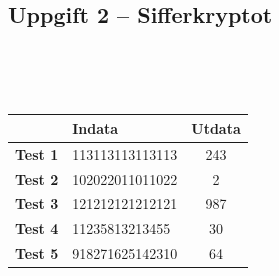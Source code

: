 \documentclass[a4paper,12pt,oneside]{amsbook}
\theoremstyle{test}
\newcommand{\fe}[1]{\textbf{#1}}            %
\begin{document}
\subsection*{Uppgift 2 -- Sifferkryptot}
~\\
{\tt 
\begin{tabular}{||l||l||c||}\hline\hline
& {\fe{Indata}} & \fe{Utdata} \\ \hline \hline
\fe{Test 1} & 113113113113113 & 243\\ \hline
\fe{Test 2} & 102022011011022 & 2 \\ \hline
\fe{Test 3} & 121212121212121 & 987\\ \hline
\fe{Test 4} & 11235813213455 & 30\\ \hline
\fe{Test 5} & 918271625142310 & 64\\ \hline\hline
\end{tabular}
}


\newpage
\end{document}
